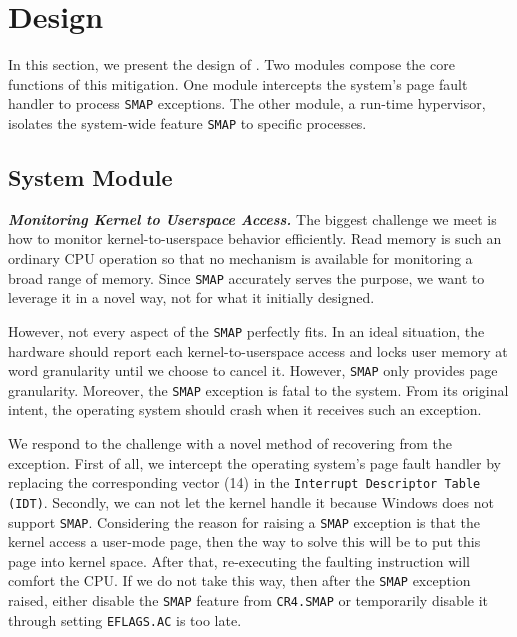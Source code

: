 
\section{\name Design}
\label{sec:ktoctou-design}

In this section, we present the design of \name. Two modules compose the core functions of this mitigation. One module intercepts the system's page fault handler to process \texttt{SMAP} exceptions. The other module, a run-time hypervisor, isolates the system-wide feature \texttt{SMAP} to specific processes.

\subsection{System Module}

\textbf{\textit{Monitoring Kernel to Userspace Access.}} The biggest challenge we meet is how to monitor kernel-to-userspace behavior efficiently. Read memory is such an ordinary CPU operation so that no mechanism is available for monitoring a broad range of memory. Since \texttt{SMAP} accurately serves the purpose, we want to leverage it in a novel way, not for what it initially designed.

However, not every aspect of the \texttt{SMAP} perfectly fits. In an ideal situation, the hardware should report each kernel-to-userspace access and locks user memory at word granularity until we choose to cancel it.  However, \texttt{SMAP} only provides page granularity. Moreover, the \texttt{SMAP} exception is fatal to the system. From its original intent, the operating system should crash when it receives such an exception.



We respond to the challenge with a novel method of recovering from the exception. First of all, we intercept the operating system's page fault handler by replacing the corresponding vector (14) in the \texttt{Interrupt Descriptor Table (IDT)}. Secondly, we can not let the kernel handle it because Windows does not support \texttt{SMAP}. Considering the reason for raising a \texttt{SMAP} exception is that the kernel access a user-mode page, then the way to solve this will be to put this page into kernel space. After that, re-executing the faulting instruction will comfort the CPU. If we do not take this way, then after the \texttt{SMAP} exception raised, either disable the \texttt{SMAP} feature from \texttt{CR4.SMAP} or temporarily disable it through setting \texttt{EFLAGS.AC} is too late. 

